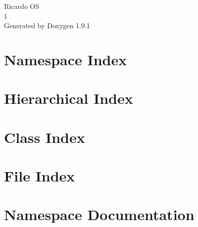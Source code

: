 \let\mypdfximage\pdfximage\def\pdfximage{\immediate\mypdfximage}\documentclass[twoside]{book}
\newcommand{\+}{\discretionary{\mbox{\scriptsize$\hookleftarrow$}}{}{}}
\newcommand{\clearemptydoublepage}{%
  \newpage{\pagestyle{empty}\cleardoublepage}%
}
\begin{document}
\raggedbottom

\hypersetup{pageanchor=false,
             bookmarksnumbered=true,
             pdfencoding=unicode
            }
\begin{titlepage}
\vspace*{7cm}
\begin{center}%
{\Large Ricardo OS \\[1ex]\large 1 }\\
\vspace*{1cm}
{\large Generated by Doxygen 1.9.1}\\
\end{center}
\end{titlepage}
\clearemptydoublepage
{}
\tableofcontents
\clearemptydoublepage
{}
\hypersetup{pageanchor=true}

\chapter{Namespace Index}

\chapter{Hierarchical Index}

\chapter{Class Index}

\chapter{File Index}

\chapter{Namespace Documentation}

\end{document}
